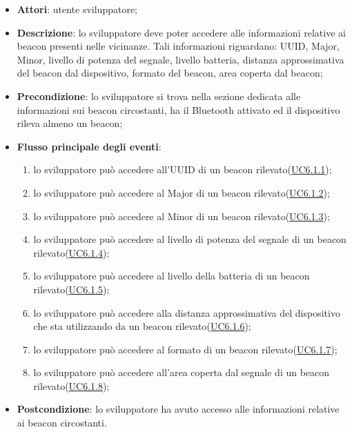 \documentclass[../AnalisiDeiRequisiti.tex]{subfiles}
\begin{document}
\begin{itemize}
\item \textbf{Attori}: utente sviluppatore;
\item \textbf{Descrizione}: lo sviluppatore deve poter accedere alle informazioni relative ai beacon presenti nelle vicinanze. Tali informazioni riguardano: UUID, Major, Minor, livello di potenza del segnale, livello batteria, distanza approssimativa del beacon dal dispositivo, formato del beacon, area coperta dal beacon; 
      \item \textbf{Precondizione}: lo sviluppatore si trova nella sezione dedicata alle informazioni sui beacon circostanti, ha il Bluetooth attivato ed il dispositivo rileva almeno un beacon;
      \item \textbf{Flusso principale degli eventi}:
          \begin{enumerate}
            \item lo sviluppatore può accedere all'UUID di un beacon rilevato(\hyperlink{UC6.1.1}{UC6.1.1});
            \item lo sviluppatore può accedere al Major di un beacon rilevato(\hyperlink{UC6.1.2}{UC6.1.2});
            \item lo sviluppatore può accedere al Minor di un beacon rilevato(\hyperlink{UC6.1.3}{UC6.1.3});
            \item lo sviluppatore può accedere al livello di potenza del segnale di un beacon rilevato(\hyperlink{UC6.1.4}{UC6.1.4});
            \item lo sviluppatore può accedere al livello della batteria di un beacon rilevato(\hyperlink{UC6.1.5}{UC6.1.5});
            \item lo sviluppatore può accedere alla distanza approssimativa del dispositivo che sta utilizzando da un beacon rilevato(\hyperlink{UC6.1.6}{UC6.1.6});
            \item lo sviluppatore può accedere al formato di un beacon rilevato(\hyperlink{UC6.1.7}{UC6.1.7});
            \item lo sviluppatore può accedere all'area coperta dal segnale di un beacon rilevato(\hyperlink{UC6.1.8}{UC6.1.8});
          \end{enumerate}
      \item \textbf{Postcondizione}: lo sviluppatore ha avuto accesso alle informazioni relative ai beacon circostanti.
  \end{itemize}
\hypertarget{UC6.1.1}{}
\end{document}
